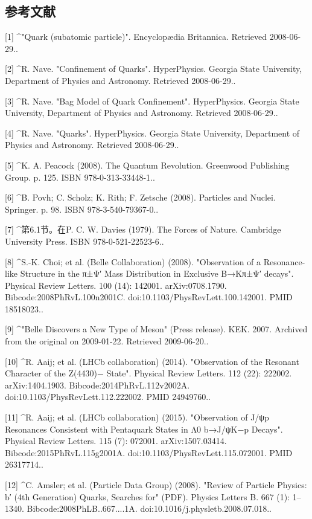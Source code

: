 \subsection{参考文献}
[1]
^"Quark (subatomic particle)". Encyclopædia Britannica. Retrieved 2008-06-29..

[2]
^R. Nave. "Confinement of Quarks". HyperPhysics. Georgia State University, Department of Physics and Astronomy. Retrieved 2008-06-29..

[3]
^R. Nave. "Bag Model of Quark Confinement". HyperPhysics. Georgia State University, Department of Physics and Astronomy. Retrieved 2008-06-29..

[4]
^R. Nave. "Quarks". HyperPhysics. Georgia State University, Department of Physics and Astronomy. Retrieved 2008-06-29..

[5]
^K. A. Peacock (2008). The Quantum Revolution. Greenwood Publishing Group. p. 125. ISBN 978-0-313-33448-1..

[6]
^B. Povh; C. Scholz; K. Rith; F. Zetsche (2008). Particles and Nuclei. Springer. p. 98. ISBN 978-3-540-79367-0..

[7]
^第6.1节。在P. C. W. Davies (1979). The Forces of Nature. Cambridge University Press. ISBN 978-0-521-22523-6..

[8]
^S.-K. Choi; et al. (Belle Collaboration) (2008). "Observation of a Resonance-like Structure in the π±Ψ′ Mass Distribution in Exclusive B→Kπ±Ψ′ decays". Physical Review Letters. 100 (14): 142001. arXiv:0708.1790. Bibcode:2008PhRvL.100n2001C. doi:10.1103/PhysRevLett.100.142001. PMID 18518023..

[9]
^"Belle Discovers a New Type of Meson" (Press release). KEK. 2007. Archived from the original on 2009-01-22. Retrieved 2009-06-20..

[10]
^R. Aaij; et al. (LHCb collaboration) (2014). "Observation of the Resonant Character of the Z(4430)− State". Physical Review Letters. 112 (22): 222002. arXiv:1404.1903. Bibcode:2014PhRvL.112v2002A. doi:10.1103/PhysRevLett.112.222002. PMID 24949760..

[11]
^R. Aaij; et al. (LHCb collaboration) (2015). "Observation of J/ψp Resonances Consistent with Pentaquark States in Λ0 b→J/ψK−p Decays". Physical Review Letters. 115 (7): 072001. arXiv:1507.03414. Bibcode:2015PhRvL.115g2001A. doi:10.1103/PhysRevLett.115.072001. PMID 26317714..

[12]
^C. Amsler; et al. (Particle Data Group) (2008). "Review of Particle Physics: b′ (4th Generation) Quarks, Searches for" (PDF). Physics Letters B. 667 (1): 1–1340. Bibcode:2008PhLB..667....1A. doi:10.1016/j.physletb.2008.07.018..

